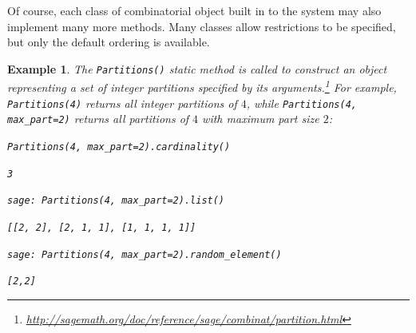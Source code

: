 \documentclass[12pt]{article}
\theoremstyle{plain}
\newtheorem{exa}{Example}
\newcommand{\codefont}[1]{{\fontshape{n}\texttt{#1}}}
\newenvironment{snippet}{\vspace{10px}\fontfamily{ppl}\selectfont}{\vspace{10px}}
\begin{document}
Of course, each class of combinatorial object built in to the system may also implement many more methods.
Many classes allow restrictions to be specified, but only the default ordering is available.





\begin{exa}
The \codefont{Partitions()} static method is called to construct an object representing a set of integer partitions specified by its arguments.\footnote{
 \url{http://sagemath.org/doc/reference/sage/combinat/partition.html}
}
For example, \codefont{Partitions(4)} returns all integer partitions of \( 4 \), while \codefont{Partitions(4, max\_part=2)} returns all partitions of \(4\) with maximum part size \(2\):

\begin{snippet}
\codefont{Partitions(4, max\_part=2).cardinality()}

\codefont{3}

\codefont{sage: Partitions(4, max\_part=2).list()}

\codefont{[[2, 2], [2, 1, 1], [1, 1, 1, 1]]}

\codefont{sage: Partitions(4, max\_part=2).random\_element()}

\codefont{[2,2] }
\end{snippet}
\end{exa}
\end{document}
